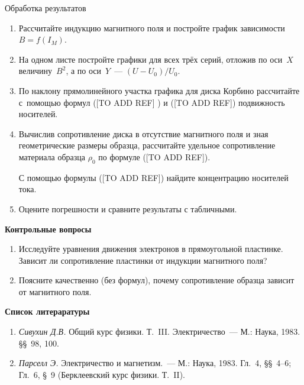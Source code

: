 {\rm Обработка результатов}
\begin{enumerate}





\item { Рассчитайте индукцию магнитного поля и постройте график зависимости~$B=f(I_{M})$.}

\item { На одном листе постройте графики для всех трёх серий, отложив по оси~$X$ величину~$B^2$, а по оси~$Y$~--- $(U-U_0)/U_0$.}

\item { По наклону прямолинейного участка графика для диска Корбино рассчитайте с~помощью формул ([TO ADD REF] ) и ([TO ADD REF]) подвижность носителей.}

\item { Вычислив сопротивление диска в отсутствие магнитного поля и зная геометрические размеры образца, рассчитайте удельное сопротивление материала образца $\rho_0$ по формуле ([TO ADD REF]).

С помощью формулы ([TO ADD REF]) найдите концентрацию носителей тока.}

\item { Оцените погрешности и сравните результаты с табличными.}
\end{enumerate}

{

\small

{\bf \Large Контрольные вопросы}
\begin{enumerate}


\item{ Исследуйте уравнения движения электронов в прямоугольной пластинке. Зависит ли сопротивление пластинки от индукции магнитного поля?}

\item{ Поясните качественно (без формул), почему сопротивление образца зависит от магнитного поля.}
\end{enumerate}

{\bf \Large Список литераратуры}

\begin{enumerate}

\item{ \emph{Сивухин Д.В.} Общий курс физики. Т.~III. Электричество~--- М.: Наука, 1983. \S\S~98, 100.}

\item{ \emph{Парселл Э.} Электричество и магнетизм.~--- М.: Наука, 1983. Гл.~4, \S\S~4--6; Гл.~6, \S~9 (Берклеевский курс физики. Т.~II).}

\end{enumerate}
}

